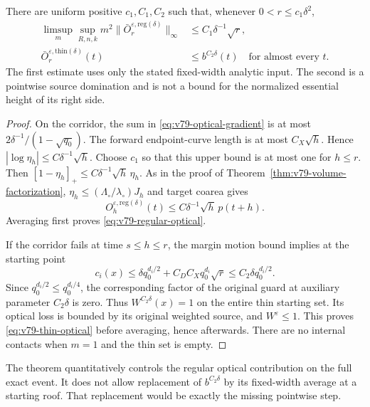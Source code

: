 \begin{theorem}
\label{thm:v79-regular-optical}
There are uniform positive $c_1,C_1,C_2$ such that, whenever
$0<r\le c_1\delta^2$,
\begin{align}
 \limsup_m\sup_{R,n,k}m^2
 \|\bar O_r^{\varepsilon,\mathrm{reg}(\delta)}\|_\infty
                         &\le C_1\delta^{-1}\sqrt r,
                                      \label{eq:v79-regular-optical}\\
 \bar O_r^{\varepsilon,\mathrm{thin}(\delta)}(t)
                         &\le b^{C_2\delta}(t)
                       \quad\text{for almost every }t.
                                      \label{eq:v79-thin-optical}
\end{align}
The first estimate uses only the stated fixed-width analytic input.
The second is a pointwise source domination and is not a bound for
the normalized essential height of its right side.
\end{theorem}
\begin{proof}
On the corridor, the sum in \eqref{eq:v79-optical-gradient} is at most
$2\delta^{-1}/(1-\sqrt{q_0})$. The forward endpoint-curve length is
at most $C_X\sqrt h$. Hence $|\log\eta_h|\le C\delta^{-1}\sqrt h$.
Choose $c_1$ so that this upper bound is at most one for $h\le r$.
Then $[1-\eta_h]_+\le C\delta^{-1}\sqrt h\,\eta_h$.
As in the proof of Theorem~\ref{thm:v79-volume-factorization},
$\eta_h\le(\Lambda_\circ/\lambda_\circ)J_h$ and target coarea gives
\[
 O_h^{\varepsilon,\mathrm{reg}(\delta)}(t)
                     \le C\delta^{-1}\sqrt h\,p(t+h).
\]
Averaging first proves \eqref{eq:v79-regular-optical}.

If the corridor fails at time $s\le h\le r$, the margin motion bound
implies at the starting point
\[
 c_i(x)\le\delta q_0^{d_i/2}+C_DC_Xq_0^{d_i}\sqrt r
                          \le C_2\delta q_0^{d_i/2}.
\]
Since $q_0^{d_i/2}\le q_0^{d_i/4}$, the corresponding factor of the
original guard at auxiliary parameter $C_2\delta$ is zero. Thus
$W^{C_2\delta}(x)=1$ on the entire thin starting set. Its optical
loss is bounded by its original weighted source, and $W^\varepsilon\le1$.
This proves \eqref{eq:v79-thin-optical} before averaging, hence afterwards.
There are no internal contacts when $m=1$ and the thin set is empty.
\end{proof}

The theorem quantitatively controls the regular optical contribution
on the full exact event. It does not allow replacement of
$b^{C_2\delta}$ by its fixed-width average at a starting roof. That
replacement would be exactly the missing pointwise step.

